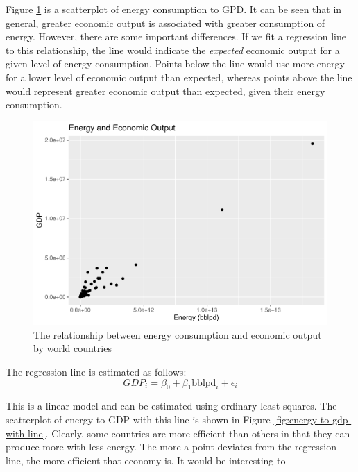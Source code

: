 \documentclass[]{elsarticle} %
\makeatletter
\def\maxwidth{\ifdim\Gin@nat@width>\linewidth\linewidth
\else\Gin@nat@width\fi}
\let\Oldincludegraphics\includegraphics
\renewcommand{\includegraphics}[1]{\Oldincludegraphics[width=\maxwidth]{#1}}
\makeatother
\begin{document}
Figure \ref{fig:energy-to-gdp} is a scatterplot of energy consumption to
GPD. It can be seen that in general, greater economic output is
associated with greater consumption of energy. However, there are some
important differences. If we fit a regression line to this relationship,
the line would indicate the \emph{expected} economic output for a given
level of energy consumption. Points below the line would use more energy
for a lower level of economic output than expected, whereas points above
the line would represent greater economic output than expected, given
their energy consumption.

\begin{figure}
\centering
\includegraphics{Elsevier-Template_files/figure-latex/fig-energy-to-gdp-1.pdf}
\caption{\label{fig:energy-to-gdp} The relationship between energy
consumption and economic output by world countries}
\end{figure}

The regression line is estimated as follows: \[
GDP_i = \beta_0 + \beta_1\text{bblpd}_i + \epsilon_i
\]

This is a linear model and can be estimated using ordinary least
squares. The scatterplot of energy to GDP with this line is shown in
Figure \ref{fig:energy-to-gdp-with-line}. Clearly, some countries are
more efficient than others in that they can produce more with less
energy. The more a point deviates from the regression line, the more
efficient that economy is. It would be interesting to
\end{document}
